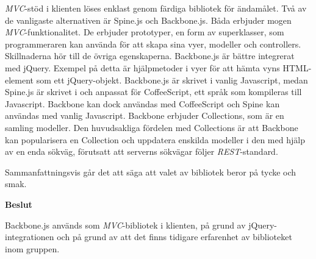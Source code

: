 \emph{MVC}-stöd i klienten löses enklast genom färdiga bibliotek för ändamålet. Två av de vanligaste alternativen är Spine.js och Backbone.js.
Båda erbjuder mogen \emph{MVC}-funktionalitet. De erbjuder prototyper, en form av superklasser, som programmeraren kan använda för att skapa sina vyer, modeller och controllers. Skillnaderna hör till de övriga egenskaperna. 
Backbone.js är bättre integrerat med jQuery. Exempel på detta är hjälpmetoder i vyer för att hämta vyns HTML-element som ett jQuery-objekt. Backbone.js är skrivet i vanlig Javascript, medan Spine.js är skrivet i och anpassat för CoffeeScript, ett språk som kompileras till Javascript. Backbone kan dock användas med CoffeeScript och Spine kan användas med vanlig Javascript. Backbone erbjuder Collections, som är en samling modeller. Den huvudsakliga fördelen med Collections är att Backbone kan popularisera en Collection och uppdatera enskilda modeller i den med hjälp av en enda sökväg, förutsatt att serverns sökvägar följer \emph{REST}-standard.

Sammanfattningsvis går det att säga att valet av bibliotek beror på tycke och smak.

\begin{flushright}
  
  \textbf{Beslut}
  
  Backbone.js används som \emph{MVC}-bibliotek i klienten, på grund av jQuery-integrationen och på grund av att det finns tidigare erfarenhet av biblioteket inom gruppen.
  
\end{flushright}
